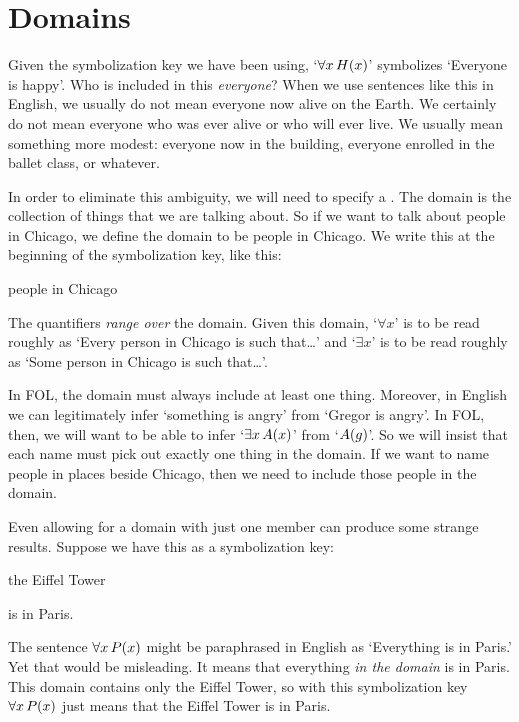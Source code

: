\section{Domains}
Given the symbolization key we have been using, `$\forall x\,\mathord{H}(x)$' symbolizes `Everyone is happy'.  Who is included in this \emph{everyone}? When we use sentences like this in English, we usually do not mean everyone now alive on the Earth. We certainly do not mean everyone who was ever alive or who will ever live. We usually mean something more modest: everyone now in the building, everyone enrolled in the ballet class, or whatever.

In order to eliminate this ambiguity, we will need to specify a . The domain is the collection of things that we are talking about. So if we want to talk about people in Chicago, we define the domain to be people in Chicago. We write this at the beginning of the symbolization key, like this:
	\begin{ekey}
		\item[\text{domain}] people in Chicago
	\end{ekey}
The quantifiers \emph{range over} the domain. Given this domain, `$\forall x$' is to be read roughly as `Every person in Chicago is such that\ldots' and `$\exists x$' is to be read roughly as `Some person in Chicago is such that\ldots'. 


In FOL, the domain must always include at least one thing. Moreover, in English we can legitimately infer `something is angry' from `Gregor is angry'. In FOL, then, we will want to be able to infer `$\exists x\,\mathord{A}(x)$' from `$\mathord{A}(g)$'. So we will insist that each name must pick out exactly one thing in the domain. If we want to name people in places beside Chicago, then we need to include those people in the domain. 

Even allowing for a domain with just one member can produce some strange results. Suppose we have this as a symbolization key:
\begin{ekey}
\item[\text{domain}] the Eiffel Tower
\item[\atom{P}{x}]  is in Paris.
\end{ekey}
The sentence $\forall x\,\mathord{P}(x)$ might be paraphrased in English as `Everything is in Paris.' Yet that would be misleading. It means that everything \emph{in the domain} is in Paris. This domain contains only the Eiffel Tower, so with this symbolization key $\forall x\,\mathord{P}(x)$ just means that the Eiffel Tower is in Paris.


